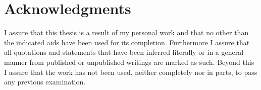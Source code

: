 


\chapter{Acknowledgments}

I assure that this thesis is a result of my personal work and that no other
than the indicated aids have been used for its completion. Furthermore I assure
that all quotations and statements that have been inferred literally or in a
general manner from published or unpublished writings are marked as such.
Beyond this I assure that the work has not been used, neither completely nor in
parts, to pass any previous examination.
